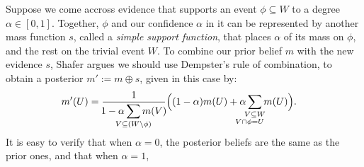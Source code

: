 \begin{example}
Suppose we come accross evidence that supports an event $\phi 
\subseteq W$ to a degree $\alpha \in [0,1]$.
Together, $\phi$ and our confidence $\alpha$ in it
can be represented by another mass function $s$,
called a \emph{simple support function},
that places $\alpha$ of its mass on $\phi$, and the rest on the trivial event $W$.
%
%
To combine our prior belief $m$ with the new evidence $s$,
Shafer argues we should use Dempster's rule of combination,
to obtain a posterior $m' := m \oplus s$, 
given in this case by:
\begin{align*}
 	m'(U) &= 
	\frac{1}{\!\displaystyle 1 - \alpha \sum_{\mathclap{V \subseteq (W \setminus \phi)}} m(V)\!}
	\Big(
	(1-\alpha) m(U) + 
	\alpha \sum_{\substack{\mathclap{V \subseteq W} \\ \mathllap{V \cap \phi} = \mathrlap{U}}} m(U) 
		\Big).
\end{align*}
It is easy to verify that when $\alpha = 0$, the posterior beliefs are the same as the
prior ones, and that when $\alpha = 1$,

\end{example}
